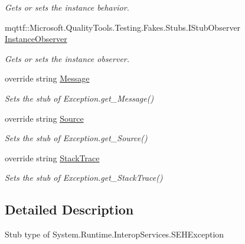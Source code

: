 \begin{DoxyCompactItemize}
\begin{DoxyCompactList}\small\item\em Gets or sets the instance behavior.\end{DoxyCompactList}\item 
mqttf\-::\-Microsoft.\-Quality\-Tools.\-Testing.\-Fakes.\-Stubs.\-I\-Stub\-Observer \hyperlink{class_system_1_1_runtime_1_1_interop_services_1_1_fakes_1_1_stub_s_e_h_exception_a2778e78c9c8996e42b021be4a3c9340c}{Instance\-Observer}
\begin{DoxyCompactList}\small\item\em Gets or sets the instance observer.\end{DoxyCompactList}\item 
override string \hyperlink{class_system_1_1_runtime_1_1_interop_services_1_1_fakes_1_1_stub_s_e_h_exception_abef69adb3419f98ba3aac763de23b381}{Message}
\begin{DoxyCompactList}\small\item\em Sets the stub of Exception.\-get\-\_\-\-Message()\end{DoxyCompactList}\item 
override string \hyperlink{class_system_1_1_runtime_1_1_interop_services_1_1_fakes_1_1_stub_s_e_h_exception_a2c3853b4ba88fae60431d3105ff1f469}{Source}
\begin{DoxyCompactList}\small\item\em Sets the stub of Exception.\-get\-\_\-\-Source()\end{DoxyCompactList}\item 
override string \hyperlink{class_system_1_1_runtime_1_1_interop_services_1_1_fakes_1_1_stub_s_e_h_exception_a641cd4ee216d2a7bd68756ca55279bd9}{Stack\-Trace}
\begin{DoxyCompactList}\small\item\em Sets the stub of Exception.\-get\-\_\-\-Stack\-Trace()\end{DoxyCompactList}\end{DoxyCompactItemize}


\subsection{Detailed Description}
Stub type of System.\-Runtime.\-Interop\-Services.\-S\-E\-H\-Exception




